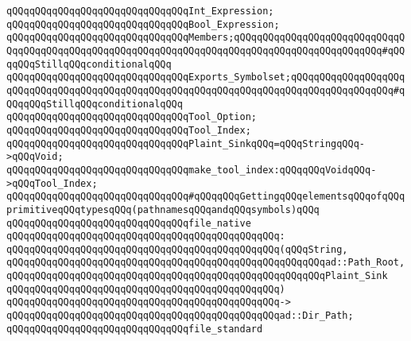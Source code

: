 \verb|qQQqqQQqqQQqqQQqqQQqqQQqqQQqqQQqInt_Expression;|\newline
\verb|qQQqqQQqqQQqqQQqqQQqqQQqqQQqqQQqBool_Expression;|\newline
\newline
\verb|qQQqqQQqqQQqqQQqqQQqqQQqqQQqqQQqMembers;qQQqqQQqqQQqqQQqqQQqqQQqqQQqqQQqqQQqqQQqqQQqqQQqqQQqqQQqqQQqqQQqqQQqqQQqqQQqqQQqqQQqqQQqqQQqqQQq#qQQqqQQqStillqQQqconditionalqQQq|\newline
\verb|qQQqqQQqqQQqqQQqqQQqqQQqqQQqqQQqExports_Symbolset;qQQqqQQqqQQqqQQqqQQqqQQqqQQqqQQqqQQqqQQqqQQqqQQqqQQqqQQqqQQqqQQqqQQqqQQqqQQqqQQqqQQqqQQq#qQQqqQQqStillqQQqconditionalqQQq|\newline
\newline
\verb|qQQqqQQqqQQqqQQqqQQqqQQqqQQqqQQqTool_Option;|\newline
\verb|qQQqqQQqqQQqqQQqqQQqqQQqqQQqqQQqTool_Index;|\newline
\newline
\verb|qQQqqQQqqQQqqQQqqQQqqQQqqQQqqQQqPlaint_SinkqQQq=qQQqStringqQQq->qQQqVoid;|\newline
\newline
\verb|qQQqqQQqqQQqqQQqqQQqqQQqqQQqqQQqmake_tool_index:qQQqqQQqVoidqQQq->qQQqTool_Index;|\newline
\newline
\verb|qQQqqQQqqQQqqQQqqQQqqQQqqQQqqQQq#qQQqqQQqGettingqQQqelementsqQQqofqQQqprimitiveqQQqtypesqQQq(pathnamesqQQqandqQQqsymbols)qQQq|\newline
\newline
\verb|qQQqqQQqqQQqqQQqqQQqqQQqqQQqqQQqfile_native|\newline
\verb|qQQqqQQqqQQqqQQqqQQqqQQqqQQqqQQqqQQqqQQqqQQqqQQq:|\newline
\verb|qQQqqQQqqQQqqQQqqQQqqQQqqQQqqQQqqQQqqQQqqQQqqQQq(qQQqString,|\newline
\verb|qQQqqQQqqQQqqQQqqQQqqQQqqQQqqQQqqQQqqQQqqQQqqQQqqQQqqQQqad::Path_Root,|\newline
\verb|qQQqqQQqqQQqqQQqqQQqqQQqqQQqqQQqqQQqqQQqqQQqqQQqqQQqqQQqPlaint_Sink|\newline
\verb|qQQqqQQqqQQqqQQqqQQqqQQqqQQqqQQqqQQqqQQqqQQqqQQq)|\newline
\verb|qQQqqQQqqQQqqQQqqQQqqQQqqQQqqQQqqQQqqQQqqQQqqQQq->|\newline
\verb|qQQqqQQqqQQqqQQqqQQqqQQqqQQqqQQqqQQqqQQqqQQqqQQqad::Dir_Path;|\newline
\newline
\verb|qQQqqQQqqQQqqQQqqQQqqQQqqQQqqQQqfile_standard|\newline
